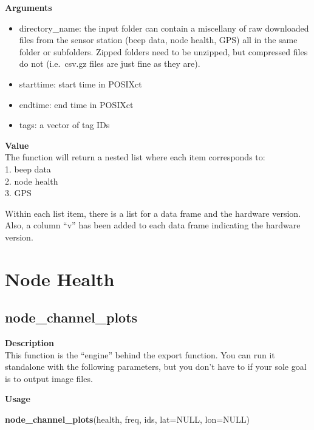 \documentclass[
]{book}
\newenvironment{Shaded}{\begin{snugshade}}{\end{snugshade}}
\newcommand{\DataTypeTok}[1]{\textcolor[rgb]{0.13,0.29,0.53}{#1}}
\newcommand{\KeywordTok}[1]{\textcolor[rgb]{0.13,0.29,0.53}{\textbf{#1}}}
\newcommand{\NormalTok}[1]{#1}
\newcommand{\OtherTok}[1]{\textcolor[rgb]{0.56,0.35,0.01}{#1}}
\providecommand{\tightlist}{%
  \setlength{\itemsep}{0pt}\setlength{\parskip}{0pt}}
\begin{document}
\textbf{Arguments}

\begin{itemize}
\tightlist
\item
  directory\_name: the input folder can contain a miscellany of raw downloaded files from the sensor station (beep data, node health, GPS) all in the same folder or subfolders. Zipped folders need to be unzipped, but compressed files do not (i.e.~csv.gz files are just fine as they are).\\
\item
  starttime: start time in POSIXct\\
\item
  endtime: end time in POSIXct\\
\item
  tags: a vector of tag IDs
\end{itemize}

\textbf{Value}\\
The function will return a nested list where each item corresponds to:\\
1. beep data\\
2. node health\\
3. GPS

Within each list item, there is a list for a data frame and the hardware version. Also, a column ``v'' has been added to each data frame indicating the hardware version.

\hypertarget{node-health}{%
\section{Node Health}\label{node-health}}

\hypertarget{node_channel_plots}{%
\subsection{node\_channel\_plots}\label{node_channel_plots}}

\textbf{Description}\\
This function is the ``engine'' behind the export function. You can run it standalone with the following parameters, but you don't have to if your sole goal is to output image files.

\textbf{Usage}

\begin{Shaded}
\begin{Highlighting}[]
\KeywordTok{node_channel_plots}\NormalTok{(health, freq, ids, }\DataTypeTok{lat=}\OtherTok{NULL}\NormalTok{, }\DataTypeTok{lon=}\OtherTok{NULL}\NormalTok{)  }
\end{Highlighting}
\end{Shaded}
\end{document}
